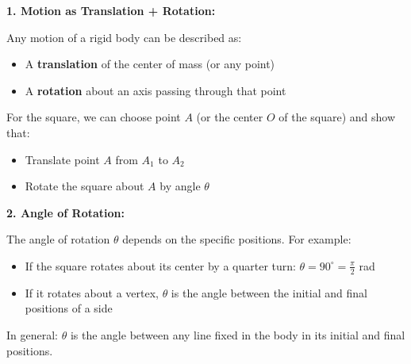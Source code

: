 \documentclass[12pt]{article}
\begin{document}
\begin{correctionbox}
\textbf{1. Motion as Translation + Rotation:}

Any motion of a rigid body can be described as:
\begin{itemize}
    \item A \textbf{translation} of the center of mass (or any point)
    \item A \textbf{rotation} about an axis passing through that point
\end{itemize}

For the square, we can choose point $A$ (or the center $O$ of the square) and show that:
\begin{itemize}
    \item Translate point $A$ from $A_1$ to $A_2$
    \item Rotate the square about $A$ by angle $\theta$
\end{itemize}

\begin{center}
\end{center}

\textbf{2. Angle of Rotation:}

The angle of rotation $\theta$ depends on the specific positions. For example:
\begin{itemize}
    \item If the square rotates about its center by a quarter turn: $\theta = 90^\circ = \frac{\pi}{2}$ rad
    \item If it rotates about a vertex, $\theta$ is the angle between the initial and final positions of a side
\end{itemize}

In general: $\theta$ is the angle between any line fixed in the body in its initial and final positions.
\end{correctionbox}
\end{document}
